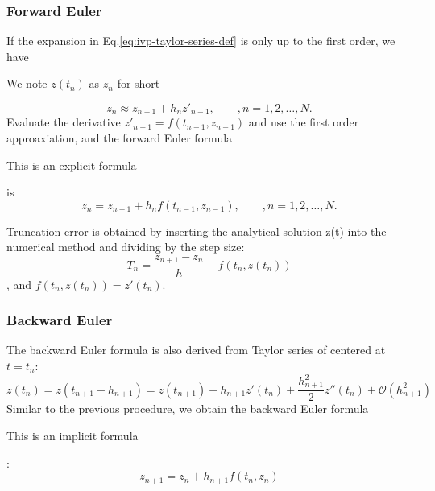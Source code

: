 \documentclass[letterpaper, 11pt]{article}
\providecommand{\note}[1]{\begin{margintable}{\footnotesize #1}\end{margintable}}
\begin{document}
\subsubsection{Forward Euler}
\label{sec-1-1-1}
If the expansion in Eq.\eqref{eq:ivp-taylor-series-def} is only up to the first order, we have 
\begin{margintable}
\footnotesize
We note $z(t_{n})$ as $z_{n}$ for short
\end{margintable}
\begin{equation}
\label{eq:ivp-forward-euler}
z_{n} \approx z_{n-1} + h_{n}z'_{n-1}, \qquad, n=1,2,\ldots,N.
\end{equation}
Evaluate the derivative $z'_{n-1} = f(t_{n-1},z_{n-1})$ and use the first order approaxiation, and the forward Euler formula\note{This is an explicit formula} is
\begin{equation}
\label{eq:ivp-forward-euler-step}
z_{n} = z_{n-1} + h_{n}f(t_{n-1},z_{n-1}), \qquad, n=1,2,\ldots,N.
\end{equation} 
\begin{margintable}
\footnotesize
Truncation error is obtained by inserting the analytical solution z(t) into the numerical method and dividing by the step size:
\[ T_{n} = \frac{z_{n+1} - z_{n}}{h} - f \left( t_{n}, z(t_{n}) \right)\],
and $f \left( t_{n}, z(t_{n}) \right) = z'(t_{n})$.
\end{margintable}
\subsubsection{Backward Euler}
\label{sec-1-1-2}
The backward Euler formula is also derived from Taylor series of centered at $t=t_{n}$:
\begin{equation}
\label{ivp-backward-euler}
z(t_{n}) = z(t_{n+1} - h_{n+1}) = z(t_{n+1}) - h_{n+1}z'(t_{n}) + \frac{h^{2}_{n+1}}{2}z''(t_{n}) + \mathcal{O}(h^{2}_{n+1})
\end{equation}
Similar to the previous procedure, we obtain the backward Euler formula\note{This is an implicit formula}:
\begin{equation}
\label{eq:ivp-backward-euler-step}
z_{n+1} = z_{n} + h_{n+1}f(t_{n},z_{n})
\end{equation}
\end{document}

